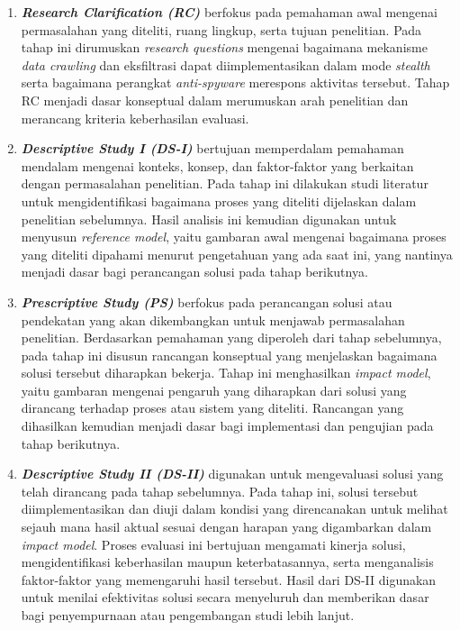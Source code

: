 \begin{enumerate}
    \item \textbf{\textit{Research Clarification (RC)}}  
    berfokus pada pemahaman awal mengenai permasalahan yang diteliti, ruang lingkup, serta tujuan penelitian. Pada tahap ini dirumuskan \textit{research questions} mengenai bagaimana mekanisme \textit{data crawling} dan eksfiltrasi dapat diimplementasikan dalam mode \textit{stealth} serta bagaimana perangkat \textit{anti-spyware} merespons aktivitas tersebut. Tahap RC menjadi dasar konseptual dalam merumuskan arah penelitian dan merancang kriteria keberhasilan evaluasi.

    \item \textbf{\textit{Descriptive Study I (DS-I)}}  
    bertujuan memperdalam pemahaman mendalam mengenai konteks, konsep, dan faktor-faktor yang berkaitan dengan permasalahan penelitian. Pada tahap ini dilakukan studi literatur untuk mengidentifikasi bagaimana proses yang diteliti dijelaskan dalam penelitian sebelumnya. Hasil analisis ini kemudian digunakan untuk menyusun \textit{reference model}, yaitu gambaran awal mengenai bagaimana proses yang diteliti dipahami menurut pengetahuan yang ada saat ini, yang nantinya menjadi dasar bagi perancangan solusi pada tahap berikutnya.

    \item \textbf{\textit{Prescriptive Study (PS)}}  
    berfokus pada perancangan solusi atau pendekatan yang akan dikembangkan untuk menjawab permasalahan penelitian. Berdasarkan pemahaman yang diperoleh dari tahap sebelumnya, pada tahap ini disusun rancangan konseptual yang menjelaskan bagaimana solusi tersebut diharapkan bekerja. Tahap ini menghasilkan \textit{impact model}, yaitu gambaran mengenai pengaruh yang diharapkan dari solusi yang dirancang terhadap proses atau sistem yang diteliti. Rancangan yang dihasilkan kemudian menjadi dasar bagi implementasi dan pengujian pada tahap berikutnya.

    \item \textbf{\textit{Descriptive Study II (DS-II)}}  
    digunakan untuk mengevaluasi solusi yang telah dirancang pada tahap sebelumnya. Pada tahap ini, solusi tersebut diimplementasikan dan diuji dalam kondisi yang direncanakan untuk melihat sejauh mana hasil aktual sesuai dengan harapan yang digambarkan dalam \textit{impact model}. Proses evaluasi ini bertujuan mengamati kinerja solusi, mengidentifikasi keberhasilan maupun keterbatasannya, serta menganalisis faktor-faktor yang memengaruhi hasil tersebut. Hasil dari DS-II digunakan untuk menilai efektivitas solusi secara menyeluruh dan memberikan dasar bagi penyempurnaan atau pengembangan studi lebih lanjut.
\end{enumerate}